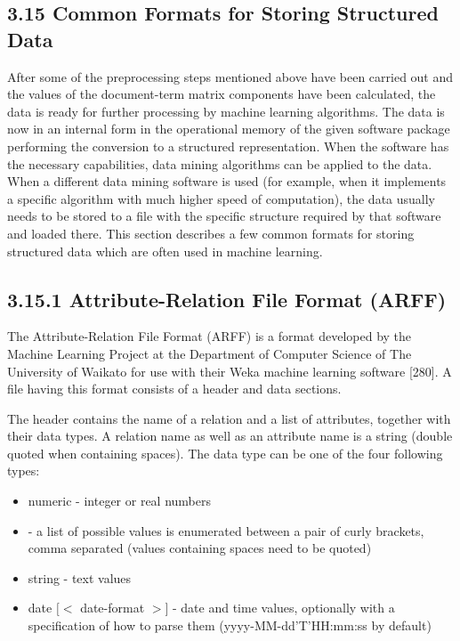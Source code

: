 \documentclass[10pt]{book}
\begin{document}
\subsection*{3.15 Common Formats for Storing Structured Data}
After some of the preprocessing steps mentioned above have been carried out and the values of the document-term matrix components have been calculated, the data is ready for further processing by machine learning algorithms. The data is now in an internal form in the operational memory of the given software package performing the conversion to a structured representation. When the software has the necessary capabilities, data mining algorithms can be applied to the data. When a different data mining software is used (for example, when it implements a specific algorithm with much higher speed of computation), the data usually needs to be stored to a file with the specific structure required by that software and loaded there. This section describes a few common formats for storing structured data which are often used in machine learning.

\subsection*{3.15.1 Attribute-Relation File Format (ARFF)}
The Attribute-Relation File Format (ARFF) is a format developed by the Machine Learning Project at the Department of Computer Science of The University of Waikato for use with their Weka machine learning software [280]. A file having this format consists of a header and data sections.

The header contains the name of a relation and a list of attributes, together with their data types. A relation name as well as an attribute name is a string (double quoted when containing spaces). The data type can be one of the four following types:

\begin{itemize}
  \item numeric - integer or real numbers
  \item <nominal-specification> - a list of possible values is enumerated between a pair of curly brackets, comma separated (values containing spaces need to be quoted)
  \item string - text values
  \item date $[<$ date-format $>]$ - date and time values, optionally with a specification of how to parse them (yyyy-MM-dd'T'HH:mm:ss by default)
\end{itemize}
\end{document}
